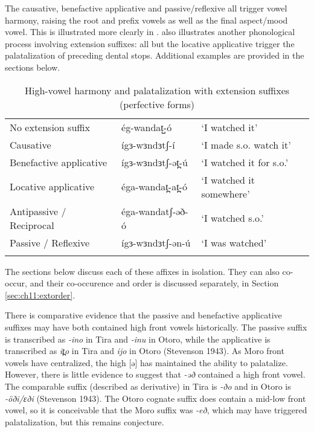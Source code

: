 The causative, benefactive applicative and passive/reflexive all trigger vowel harmony, raising the root and prefix vowels as well as the final aspect/mood vowel. This is illustrated more clearly in .  also illustrates another phonological process involving extension suffixes: all but the locative applicative trigger the palatalization of preceding dental stops. Additional examples are provided in the sections below.

\begin{table} %
\caption{High-vowel harmony and palatalization with extension suffixes (perfective forms)} \label{tab:ch11:exvh}
\begin{tabular}[t]{lll}
\lsptoprule
No extension suffix &  ég-wandat̺-ó  &  ‘I watched it’  \\
Causative & 	ígɜ-wɜndɜtʃ-í & `I made s.o. watch it'\\
Benefactive applicative & ígɜ-wɜndɜtʃ-ət̪-ú	& ‘I watched it for s.o.’ \\
Locative applicative & éga-wandat̪-at̪-ó	& ‘I watched it somewhere’ \\
Antipassive / Reciprocal &  éga-wandatʃ-əð-ó & ‘I watched s.o.’ \\
Passive / Reflexive & ígɜ-wɜndɜtʃ-ən-ú	& ‘I was watched’ \\
\lspbottomrule
\end{tabular}
\end{table}

The sections below discuss each of these affixes in isolation. They can also co-occur, and their co-occurence and order is discussed separately, in Section \ref{sec:ch11:extorder}.

There is comparative evidence that the passive and benefactive applicative suffixes may have both contained high front vowels historically. The passive suffix is transcribed as \textit{-ino} in Tira and \textit{-inu} in Otoro, while the applicative is transcribed as \textit{it̪o} in Tira and \textit{ijo} in Otoro (Stevenson 1943). As Moro front vowels have centralized, the high [ə] has maintained the ability to palatalize. However, there is little evidence to suggest that \textit{-əð} contained a high front vowel. The comparable suffix (described as derivative) in Tira is \textit{-ðo} and in Otoro is \textit{-öði/ɛði} (Stevenson 1943). The Otoro cognate suffix does contain a mid-low front vowel, so it is conceivable that the Moro suffix was \textit{-eð}, which may have triggered palatalization, but this remains conjecture. 



